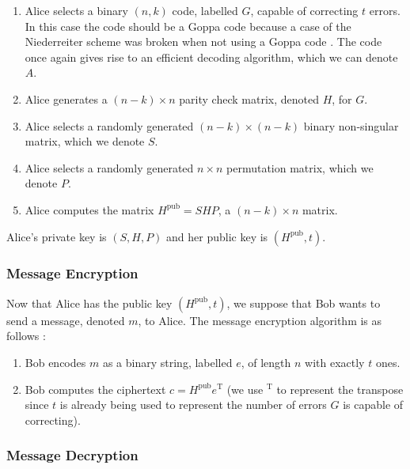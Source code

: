 \begin{enumerate}
    \item Alice selects a binary $(n, k)$ code, labelled $G$, capable of correcting $t$ errors. In this case the code should be a Goppa code because a case of the Niederreiter scheme was broken when not using a Goppa code \cite{SIDELNIKOVSHESTAKOV+1992+439+444}. The code once again gives rise to an efficient decoding algorithm, which we can denote $A$.
    
    \item Alice generates a $(n - k) \times n$ parity check matrix, denoted $H$, for $G$.
    
    \item Alice selects a randomly generated $(n - k) \times (n - k)$ binary non-singular matrix, which we denote $S$.
    
    \item Alice selects a randomly generated $n \times n$ permutation matrix, which we denote $P$.
    
    \item Alice computes the matrix $H^{\mathrm{pub}} = SHP$, a $(n - k) \times n$ matrix.
\end{enumerate}
Alice's private key is $(S, H, P)$ and her public key is $\left(H^{\mathrm{pub}}, t\right)$.

\subsubsection{Message Encryption}

Now that Alice has the public key $\left(H^{\mathrm{pub}}, t\right)$, we suppose that Bob wants to send a message, denoted $m$, to Alice. The message encryption algorithm is as follows \cite{80003180051}:

\begin{enumerate}
    \item Bob encodes $m$ as a binary string, labelled $e$, of length $n$ with exactly $t$ ones.
    
    \item Bob computes the ciphertext $c = H^{\mathrm{pub}}e^{\mathrm{T}}$ (we use $^\mathrm{T}$ to represent the transpose since $t$ is already being used to represent the number of errors $G$ is capable of correcting).
\end{enumerate}

\subsubsection{Message Decryption}

